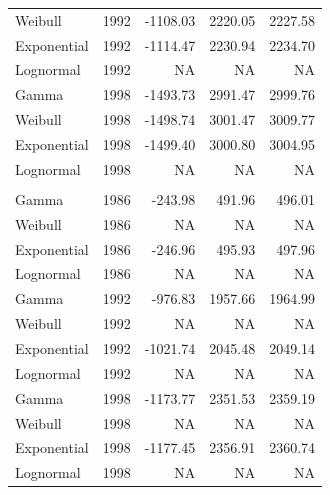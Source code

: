 \documentclass[
11pt, %
oneside, %
english, %
singlespacing, %
]{macthesis} %
\begin{document}
\begin{table}
\begin{tabular}[t]{llrrr}
\hspace{1em}Weibull & 1992 & -1108.03 & 2220.05 & 2227.58\\
\hspace{1em}Exponential & 1992 & -1114.47 & 2230.94 & 2234.70\\
\hspace{1em}Lognormal & 1992 & NA & NA & \vphantom{1} NA\\
\hspace{1em}Gamma & 1998 & -1493.73 & 2991.47 & 2999.76\\
\hspace{1em}Weibull & 1998 & -1498.74 & 3001.47 & 3009.77\\
\hspace{1em}Exponential & 1998 & -1499.40 & 3000.80 & 3004.95\\
\hspace{1em}Lognormal & 1998 & NA & NA & \vphantom{1} NA\\
\addlinespace[0.3em]
\multicolumn{5}{l}{\textbf{Destination: Work or school}}\\
\hspace{1em}Gamma & 1986 & -243.98 & 491.96 & 496.01\\
\hspace{1em}Weibull & 1986 & NA & NA & NA\\
\hspace{1em}Exponential & 1986 & -246.96 & 495.93 & 497.96\\
\hspace{1em}Lognormal & 1986 & NA & NA & NA\\
\hspace{1em}Gamma & 1992 & -976.83 & 1957.66 & 1964.99\\
\hspace{1em}Weibull & 1992 & NA & NA & NA\\
\hspace{1em}Exponential & 1992 & -1021.74 & 2045.48 & 2049.14\\
\hspace{1em}Lognormal & 1992 & NA & NA & NA\\
\hspace{1em}Gamma & 1998 & -1173.77 & 2351.53 & 2359.19\\
\hspace{1em}Weibull & 1998 & NA & NA & NA\\
\hspace{1em}Exponential & 1998 & -1177.45 & 2356.91 & 2360.74\\
\hspace{1em}Lognormal & 1998 & NA & NA & NA\\
\bottomrule
\end{tabular}
\end{table}
\end{document}
